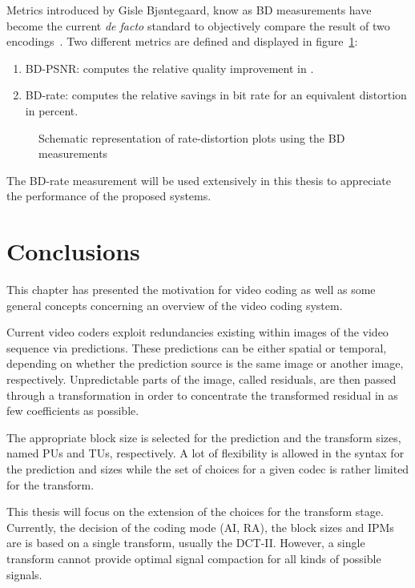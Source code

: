 \documentclass[11pt,a4paper,openright,twoside]{book}
\numberwithin{equation}{section} %
\numberwithin{figure}{section} %
\numberwithin{table}{section} %
\begin{document}
Metrics introduced by Gisle Bjøntegaard, know as \ac{BD} measurements have
become the current \emph{de facto} standard to objectively compare the result
of two encodings~\cite{VCEG-M33,VCEG-AI11}.
Two different metrics are defined and displayed in
figure~\ref{fig:bdsnr_bdrate}:
\begin{enumerate}[label = (\alph{enumi})]
	\item \ac{BD}-\ac{PSNR}: computes the relative quality improvement
		in \deci\bel.
	\item \ac{BD}-rate: computes the relative savings in bit rate for an
		equivalent distortion in percent.
\end{enumerate}

\begin{figure}[tb]
	\centering
	\hfill
	\caption{Schematic representation of rate-distortion plots using the
	\acs{BD} measurements}
	\label{fig:bdsnr_bdrate}
\end{figure}

The \ac{BD}-rate measurement will be used extensively in this thesis to
appreciate the performance of the proposed systems.

\section{Conclusions}
\label{sec:conclusions_video_coding}

This chapter has presented the motivation for video coding as well as some
general concepts concerning an overview of the video coding system.

Current video coders exploit redundancies existing within images of the video
sequence via predictions.
These predictions can be either spatial or temporal, depending on
whether the prediction source is the same image or another image,
respectively.
Unpredictable parts of the image, called residuals, are then passed through a
transformation in order to concentrate the transformed residual in as few
coefficients as possible.

The appropriate block size is selected for the prediction and the transform
sizes, named \acp{PU} and \acp{TU}, respectively.
A lot of flexibility is allowed in the syntax for the prediction and sizes
while the set of choices for a given codec is rather limited for the
transform.

This thesis will focus on the extension of the choices for the transform
stage.
Currently, the decision of the coding mode (\ac{AI}, \ac{RA}), the block sizes
and \acp{IPM} are is based on a single transform, usually the \ac{DCT}-II.
However, a single transform cannot provide optimal signal compaction for all
kinds of possible signals.
\end{document}
